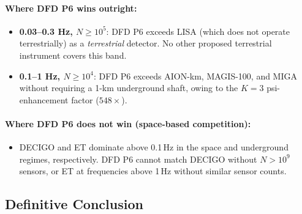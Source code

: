 \documentclass[11pt]{article}
\theoremstyle{definition}
\theoremstyle{remark}
\begin{document}
\paragraph{Where DFD P6 wins outright:}
\begin{itemize}
\item \textbf{0.03--0.3 Hz, $N \geq 10^5$}: DFD P6 exceeds LISA
  (which does not operate terrestrially) as a \emph{terrestrial} detector.
  No other proposed terrestrial instrument covers this band.
\item \textbf{0.1--1 Hz, $N \geq 10^4$}: DFD P6 exceeds AION-km,
  MAGIS-100, and MIGA without requiring a 1-km underground shaft,
  owing to the $K=3$ psi-enhancement factor ($548\times$).
\end{itemize}

\paragraph{Where DFD P6 does not win (space-based competition):}
\begin{itemize}
\item DECIGO and ET dominate above 0.1\,Hz in the space and underground
  regimes, respectively.  DFD P6 cannot match DECIGO without $N > 10^9$
  sensors, or ET at frequencies above 1\,Hz without similar sensor counts.
\end{itemize}

\subsection{Definitive Conclusion}
\end{document}
